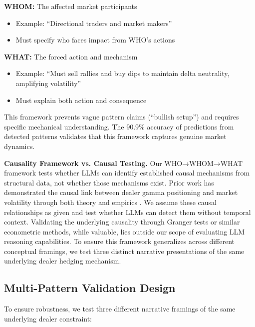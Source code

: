 \textbf{WHOM:} The affected market participants
\begin{itemize}
\item Example: ``Directional traders and market makers''
\item Must specify who faces impact from WHO's actions
\end{itemize}

\textbf{WHAT:} The forced action and mechanism
\begin{itemize}
\item Example: ``Must sell rallies and buy dips to maintain delta neutrality, amplifying volatility''
\item Must explain both action and consequence
\end{itemize}

This framework prevents vague pattern claims (``bullish setup'') and requires specific mechanical understanding. The 90.9\% accuracy of predictions from detected patterns validates that this framework captures genuine market dynamics.

\textbf{Causality Framework vs. Causal Testing.} Our WHO→WHOM→WHAT
framework tests whether LLMs can identify established causal mechanisms
from structural data, not whether those mechanisms exist. Prior work
has demonstrated the causal link between dealer gamma positioning and
market volatility through both theory \cite{frey1997market} and
empirics \cite{ni2022}. We assume these causal relationships as given
and test whether LLMs can detect them without temporal context.
Validating the underlying causality through Granger tests or similar
econometric methods, while valuable, lies outside our scope of
evaluating LLM reasoning capabilities.
To ensure this framework generalizes across different conceptual
framings, we test three distinct narrative presentations of the
same underlying dealer hedging mechanism.

\subsection{Multi-Pattern Validation Design}

To ensure robustness, we test three different narrative framings of the same underlying dealer constraint:

